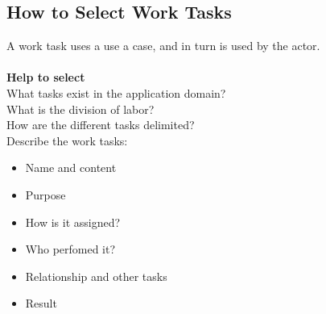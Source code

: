 \subsection*{How to Select Work Tasks}
A work task uses a use a case, and in turn is used by the actor.\\
\\
\textbf{Help to select}\\
What tasks exist in the application domain?\\
What is the division of labor?\\
How are the different tasks delimited?\\
Describe the work tasks:
\begin{itemize}
    \item Name and content
    \item Purpose
    \item How is it assigned?
    \item Who perfomed it?
    \item Relationship and other tasks
    \item Result
\end{itemize}